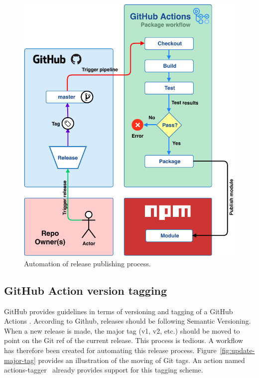 \begin{figure}[hp]
    \setlength{\abovecaptionskip}{25pt}
    \centering
    \includegraphics[page=1,scale=1]{sections/methodology/figures/package-release-automation.pdf}
    \caption{Automation of release publishing process.}
    \label{fig:release-automation}
\end{figure}

\subsection{GitHub Action version tagging}
GitHub provides guidelines in terms of versioning and tagging of a GitHub Actions \cite{github-actions-versioning}. According to Github, releases should be following Semantic Versioning. When a new release is made, the major tag (v1, v2, etc.) should be moved to point on the Git ref of the current release. This process is tedious. A workflow has therefore been created for automating this release process. Figure~\ref{fig:update-major-tag} provides an illustration of the moving of Git tags. An action named actions-tagger~\cite{actions-tagger} already provides support for this tagging scheme.

